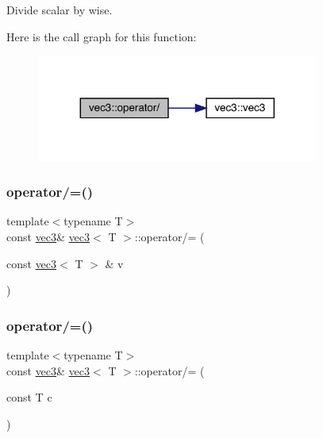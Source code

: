 Divide scalar by wise. 

Here is the call graph for this function\+:\nopagebreak
\begin{figure}[H]
\begin{center}
\leavevmode
\includegraphics[width=263pt]{structvec3_a1a47d6847627b552a0c642b356985297_cgraph}
\end{center}
\end{figure}
\mbox{\label{structvec3_a4e52fc3e08391056d0e6e01a0375c395}} 
\subsubsection{\texorpdfstring{operator/=()}{operator/=()}\hspace{0.1cm}{\footnotesize\ttfamily [1/2]}}
{\footnotesize\ttfamily template$<$typename T$>$ \\
const \mbox{\hyperlink{structvec3}{vec3}}\& \mbox{\hyperlink{structvec3}{vec3}}$<$ T $>$\+::operator/= (\begin{DoxyParamCaption}\item[{const \mbox{\hyperlink{structvec3}{vec3}}$<$ T $>$ \&}]{v }\end{DoxyParamCaption})\hspace{0.3cm}{\ttfamily [inline]}}

\mbox{\label{structvec3_a7641a7bd40a69bad917f423017d8efa6}} 
\subsubsection{\texorpdfstring{operator/=()}{operator/=()}\hspace{0.1cm}{\footnotesize\ttfamily [2/2]}}
{\footnotesize\ttfamily template$<$typename T$>$ \\
const \mbox{\hyperlink{structvec3}{vec3}}\& \mbox{\hyperlink{structvec3}{vec3}}$<$ T $>$\+::operator/= (\begin{DoxyParamCaption}\item[{const T}]{c }\end{DoxyParamCaption})\hspace{0.3cm}{\ttfamily [inline]}}

